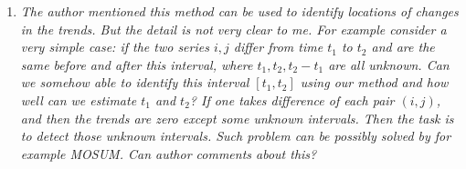 \documentclass[a4paper,12pt]{article}
\begin{document}
\begin{enumerate}[label=(\arabic*),leftmargin=0.7cm]


\item \textit{The author mentioned this method can be used to identify locations of changes in the trends. But the detail is not very clear to me. For example consider a very simple case: if the two series $i, j$ differ from time $t_1$ to $t_2$ and are the same before and after this interval, where $t_1, t_2, t_2 - t_1$ are all unknown. Can we somehow able to identify this interval $[t_1, t_2]$ using our method and how well can we estimate $t_1$ and $t_2$? If one takes difference of each pair $(i, j)$, and then the trends are zero except some unknown intervals. Then the task is to detect those unknown intervals. Such problem can be possibly solved by for example MOSUM. Can author comments about this?}


\end{enumerate}
\end{document}

